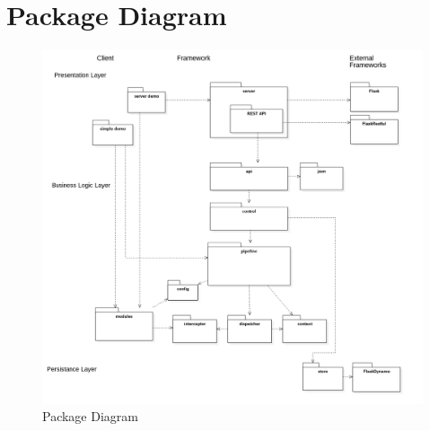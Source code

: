   \section{Package Diagram}
    \begin{figure}[H]
        \hspace{-8em}
        \includegraphics[width = 1.5\linewidth]{diagrams/architecture.png}
        \caption{Package Diagram}
        \label{fig:architecture_packages}
      \end{figure}

